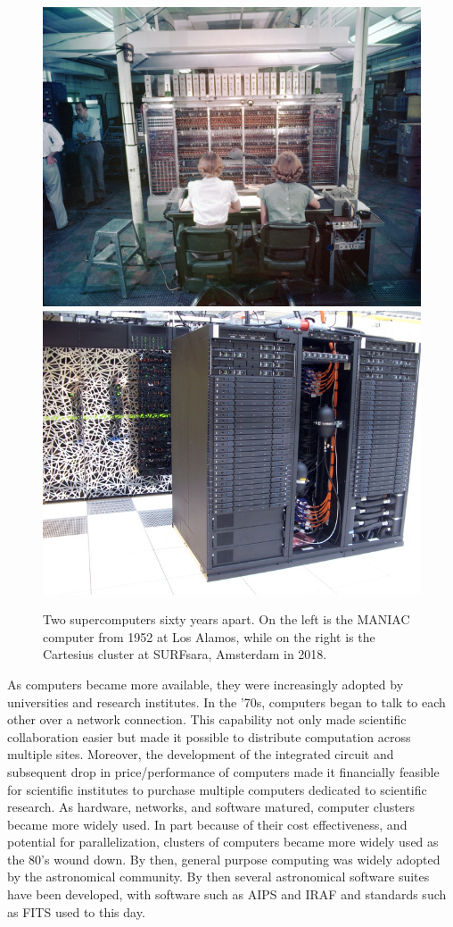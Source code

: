 \begin{figure}[h]
\includegraphics[width=.45\linewidth]{background/figures/Maniac_1952.jpg}\quad\includegraphics[width=.45\linewidth]{background/figures/cartesius.jpeg}
    \caption[Two supercomputers sixty years apart.]{Two supercomputers sixty years apart. On the left is the MANIAC computer from 1952 at Los Alamos, while on the right is the Cartesius cluster at SURFsara, Amsterdam in 2018.}
    \label{fig:intro_supercomputers}

\end{figure}

As computers became more available, they were increasingly adopted by universities and research institutes. In the '70s, computers began to talk to each other over a network connection. This capability not only made scientific collaboration easier but made it possible to distribute computation across multiple sites. Moreover, the development of the integrated circuit and subsequent drop in price/performance of computers made it financially feasible for scientific institutes to purchase multiple computers dedicated to scientific research. As hardware, networks, and software matured, computer clusters became more widely used\citep{tel_2000}. In part because of their cost effectiveness, and potential for parallelization, clusters of computers became more widely used as the 80's wound down. By then, general purpose computing was widely adopted by the astronomical community. By then several astronomical software suites have been developed, with software such as AIPS and IRAF and standards such as FITS used to this day. 

